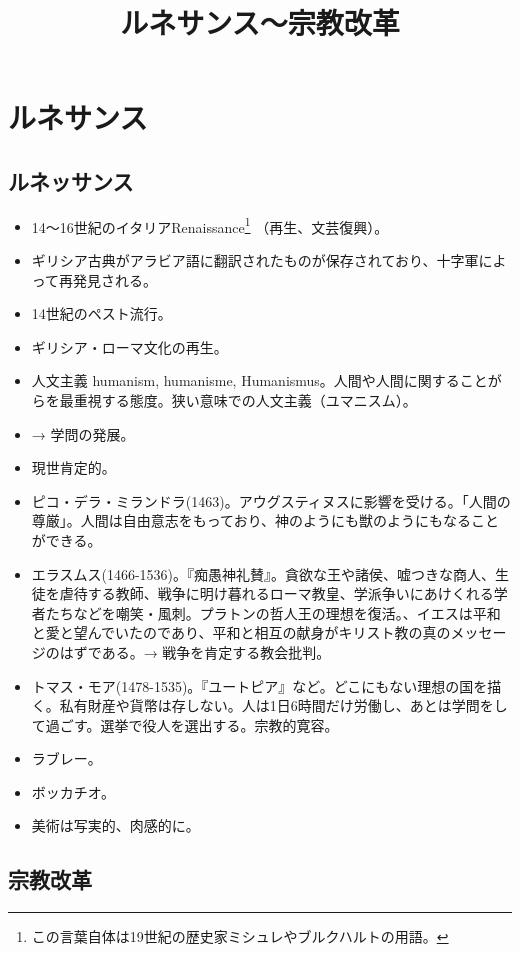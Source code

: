 \documentclass[uplatex,dvipdfmx]{jsarticle} \usepackage{mystyle}%
\title{ルネサンス〜宗教改革}
\begin{document}
\maketitle
\else\chapter{ルネサンス}
\fi


\section{ルネッサンス}

\begin{itemize}
\item 14〜16世紀のイタリアRenaissance\footnote{この言葉自体は19世紀の歴史家ミシュレやブルクハルトの用語。} （再生、文芸復興）。
\item ギリシア古典がアラビア語に翻訳されたものが保存されており、十字軍によって再発見される。
\item 14世紀のペスト流行。
\item ギリシア・ローマ文化の再生。
\item 人文主義 humanism, humanisme, Humanismus。人間や人間に関することがらを最重視する態度。狭い意味での人文主義（ユマニスム）。
\item → 学問の発展。
\item 現世肯定的。
\item ピコ・デラ・ミランドラ(1463)。アウグスティヌスに影響を受ける。「人間の尊厳」。人間は自由意志をもっており、神のようにも獣のようにもなることができる。
\item エラスムス(1466-1536)。『痴愚神礼賛』。貪欲な王や諸侯、嘘つきな商人、生徒を虐待する教師、戦争に明け暮れるローマ教皇、学派争いにあけくれる学者たちなどを嘲笑・風刺。プラトンの哲人王の理想を復活。、イエスは平和と愛と望んでいたのであり、平和と相互の献身がキリスト教の真のメッセージのはずである。→ 戦争を肯定する教会批判。
\item トマス・モア(1478-1535)。『ユートピア』など。どこにもない理想の国を描く。私有財産や貨幣は存しない。人は1日6時間だけ労働し、あとは学問をして過ごす。選挙で役人を選出する。宗教的寛容。
\item ラブレー。
\item ボッカチオ。
\item 美術は写実的、肉感的に。
\end{itemize}



\section{宗教改革}
\end{document}
